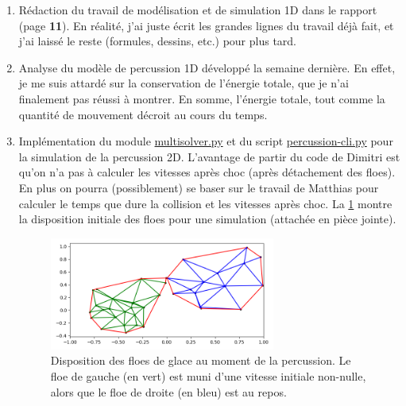\documentclass[
  french,
	11pt, %
]{fphw}
\begin{document}
\begin{enumerate}
  \item Rédaction du travail de modélisation et de simulation 1D dans le rapport (page \textbf{11}). En réalité, j'ai juste écrit les grandes lignes du travail déjà fait, et j'ai laissé le reste (formules, dessins, etc.) pour plus tard.
  \item Analyse du modèle de percussion 1D développé la semaine dernière. En effet, je me suis attardé sur la conservation de l'énergie totale, que je n'ai finalement pas réussi à montrer. En somme, l'énergie totale, tout comme la quantité de mouvement décroit au cours du temps.
  \item Implémentation du module \href{https://framagit.org/RaK/SimuRessorts/-/blob/master/springslattice/multisolver.py}{multisolver.py} et du script \href{https://framagit.org/RaK/SimuRessorts/-/blob/master/percussion-cli.py}{percussion-cli.py} pour la simulation de la percussion 2D. L'avantage de partir du code de Dimitri est qu'on n'a pas à calculer les vitesses après choc (après détachement des floes). En plus on pourra (possiblement) se baser sur le travail de Matthias pour calculer le temps que dure la collision et les vitesses après choc. La \cref{fig:myfig} montre la disposition initiale des floes pour une simulation (attachée en pièce jointe).
  \begin{figure}[H]
    \centering
    \includegraphics[width=0.70\textwidth]{Percussion2D.png}
    \caption{Disposition des floes de glace au moment de la percussion. Le floe de gauche (en vert) est muni d'une vitesse initiale non-nulle, alors que le floe de droite (en bleu) est au repos.}
    \label{fig:myfig}
  \end{figure}
\end{enumerate}


 
\end{document}
